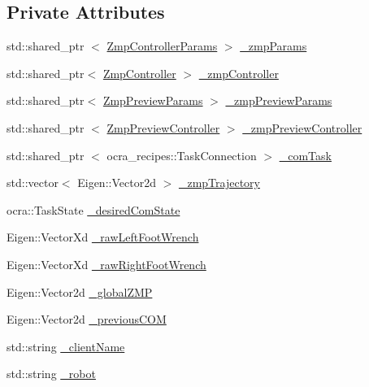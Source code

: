 \subsection*{\-Private \-Attributes}
\begin{DoxyCompactItemize}
\item 
std\-::shared\-\_\-ptr\*
$<$ \hyperlink{structZmpControllerParams}{\-Zmp\-Controller\-Params} $>$ \hyperlink{classWalkingClient_a20012b4bee7f6de8177ed53907f894cb}{\-\_\-zmp\-Params}
\item 
std\-::shared\-\_\-ptr$<$ \hyperlink{classZmpController}{\-Zmp\-Controller} $>$ \hyperlink{classWalkingClient_afc6a0ac97a4c3f83e27879e803fab8f6}{\-\_\-zmp\-Controller}
\item 
std\-::shared\-\_\-ptr$<$ \hyperlink{structZmpPreviewParams}{\-Zmp\-Preview\-Params} $>$ \hyperlink{classWalkingClient_a9a2cf2d6107ab91fc5bd1d82a3b85a84}{\-\_\-zmp\-Preview\-Params}
\item 
std\-::shared\-\_\-ptr\*
$<$ \hyperlink{classZmpPreviewController}{\-Zmp\-Preview\-Controller} $>$ \hyperlink{classWalkingClient_ae570aa07bed9e336eda93f331f3485fb}{\-\_\-zmp\-Preview\-Controller}
\item 
std\-::shared\-\_\-ptr\*
$<$ ocra\-\_\-recipes\-::\-Task\-Connection $>$ \hyperlink{classWalkingClient_aa798d6193535e80816f8107ee5fb2172}{\-\_\-com\-Task}
\item 
std\-::vector$<$ \-Eigen\-::\-Vector2d $>$ \hyperlink{classWalkingClient_a8b8a3d7fe6e12d49a0e72d05f9938564}{\-\_\-zmp\-Trajectory}
\item 
ocra\-::\-Task\-State \hyperlink{classWalkingClient_a2625bf687aa3141f5a2404c8d9b3c392}{\-\_\-desired\-Com\-State}
\item 
\-Eigen\-::\-Vector\-Xd \hyperlink{classWalkingClient_a1c3fb4d182e33d6d9386e9bb05aa4ae8}{\-\_\-raw\-Left\-Foot\-Wrench}
\item 
\-Eigen\-::\-Vector\-Xd \hyperlink{classWalkingClient_a9df32e0c73632c5f869e5933e20def71}{\-\_\-raw\-Right\-Foot\-Wrench}
\item 
\-Eigen\-::\-Vector2d \hyperlink{classWalkingClient_aa784eac1247f0d858e2364e0c2bc25b2}{\-\_\-global\-Z\-M\-P}
\item 
\-Eigen\-::\-Vector2d \hyperlink{classWalkingClient_a549751e511e023d5fc73eccd1c185317}{\-\_\-previous\-C\-O\-M}
\item 
std\-::string \hyperlink{classWalkingClient_aff02b341d5e1f500dc9a849337319a8d}{\-\_\-client\-Name}
\item 
std\-::string \hyperlink{classWalkingClient_a67461634d7e8cb0234400b34fd2865e7}{\-\_\-robot}

\end{DoxyCompactItemize}

